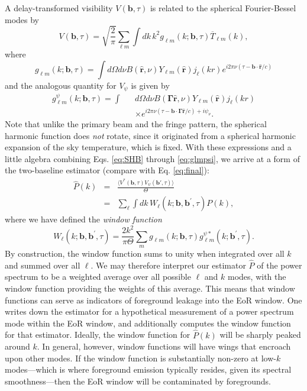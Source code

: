\documentclass[twocolumn,apj,numberedappendix]{emulateapj}
\renewcommand\[{\begin{equation}}
\renewcommand\]{\end{equation}}
\begin{document}
A delay-transformed visibility $V(\mathbf{b}, \tau) $ is related to the spherical Fourier-Bessel modes by
\begin{equation}
V(\mathbf{b}, \tau) = \sqrt{\frac{2}{\pi}} \sum_{\ell m} \int \! dk\, k^2 g_{\ell m} (k; \mathbf{b}, \tau) \overline{T}_{\ell m} (k),
\end{equation}
where
\begin{equation}
g_{\ell m} (k ; \mathbf{b}, \tau) = \int \! d\Omega d\nu B(\hat{\mathbf{r}},\nu) Y_{\ell m} (\hat{\mathbf{r}}) j_\ell (k r) e^{i 2 \pi \nu (\tau - \mathbf{b}\cdot \hat{\mathbf{r}} / c)}
\end{equation}
and the analogous quantity for $V_\psi$ is given by
\begin{eqnarray}
\label{eq:glmpsi}
g_{\ell m}^\psi (k ; \mathbf{b}, \tau) = \int && d\Omega d\nu B(\boldsymbol \Gamma \hat{\mathbf{r}},\nu) Y_{\ell m} (\hat{\mathbf{r}}) j_\ell (k r) \nonumber \\
&& \times  e^{i 2 \pi \nu (\tau - \mathbf{b}\cdot \boldsymbol \Gamma \hat{\mathbf{r}} / c) + i \psi_\nu}.
\end{eqnarray}
Note that unlike the primary beam and the fringe pattern, the spherical harmonic function does \emph{not} rotate, since it originated from a spherical harmonic expansion of the sky temperature, which is fixed. With these expressions and a little algebra combining Eqs. \eqref{eq:SHB} through \eqref{eq:glmpsi}, we arrive at a form of the two-baseline estimator (compare with Eq. \eqref{eq:final}):
\begin{eqnarray}
\hat{P}(k) &=& \frac{ \langle V^{*}(\boldsymbol{b},\tau)V_{\psi}(\boldsymbol{b'},\tau) \rangle}{\Theta} \nonumber \\
&=& \sum_\ell \int \!dk\, W_{\ell}(k; \mathbf{b}, \mathbf{b}^\prime , \tau) P(k),
\end{eqnarray}
where we have defined the \emph{window function}
\begin{equation}
W_{\ell}(k; \mathbf{b}, \mathbf{b}^\prime , \tau) = \frac{2 k^2}{\pi \Theta} \sum_m g_{\ell m} (k ; \mathbf{b}, \tau) g_{\ell m}^{\psi*} (k ; \mathbf{b}^\prime, \tau).
\end{equation}
By construction, the window function sums to unity when integrated over all $k$ and summed over all $\ell$. We may therefore interpret our estimator $\hat{P}$ of the power spectrum to be a weighted average over all possible $\ell$ and $k$ modes, with the window function providing the weights of this average. This means that window functions can serve as indicators of foreground leakage into the EoR window. One writes down the estimator for a hypothetical measurement of a power spectrum mode within the EoR window, and additionally computes the window function for that estimator. Ideally, the window function for $\hat{P}(k)$ will be sharply peaked around $k$. In general, however, window functions will have wings that encroach upon other modes. If the window function is substantially non-zero at low-$k$ modes---which is where foreground emission typically resides, given its spectral smoothness---then the EoR window will be contaminated by foregrounds.
\end{document}
